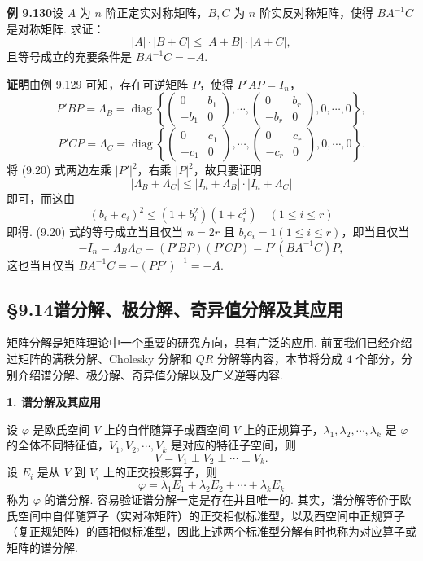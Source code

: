 \documentclass[UTF8, 12pt, fontset=fandol, oneside]{ctexart}
\begin{document}
\noindent\textbf{例 9.130}\quad 设 $A$ 为 $n$ 阶正定实对称矩阵，$B,C$ 为 $n$ 阶实反对称矩阵，使得 $BA^{-1}C$ 是对称矩阵. 求证：
\begin{equation}
|A|\cdot|B+C|\le |A+B|\cdot|A+C|,
\tag{9.20}
\end{equation}
且等号成立的充要条件是 $BA^{-1}C=-A$.

\noindent\textbf{证明}\quad 由例 9.129 可知，存在可逆矩阵 $P$，使得 $P'AP=I_n$，
\[
P'BP=\Lambda_B=\operatorname{diag}\left\{
\begin{pmatrix}
0&b_1\\
-b_1&0
\end{pmatrix},\cdots,
\begin{pmatrix}
0&b_r\\
-b_r&0
\end{pmatrix},
0,\cdots,0
\right\},
\]
\[
P'CP=\Lambda_C=\operatorname{diag}\left\{
\begin{pmatrix}
0&c_1\\
-c_1&0
\end{pmatrix},\cdots,
\begin{pmatrix}
0&c_r\\
-c_r&0
\end{pmatrix},
0,\cdots,0
\right\}.
\]
将 (9.20) 式两边左乘 $|P'|^2$，右乘 $|P|^2$，故只要证明
\[
|\Lambda_B+\Lambda_C|\le |I_n+\Lambda_B|\cdot|I_n+\Lambda_C|
\]
即可，而这由
\[
(b_i+c_i)^2\le(1+b_i^2)(1+c_i^2)\quad (1\le i\le r)
\]
即得. (9.20) 式的等号成立当且仅当 $n=2r$ 且 $b_ic_i=1(1\le i\le r)$，即当且仅当
\[
-I_n=\Lambda_B\Lambda_C=(P'BP)(P'CP)=P'(BA^{-1}C)P,
\]
这也当且仅当 $BA^{-1}C=-(PP')^{-1}=-A$.

\subsection*{§9.14\quad 谱分解、极分解、奇异值分解及其应用}

矩阵分解是矩阵理论中一个重要的研究方向，具有广泛的应用. 前面我们已经介绍过矩阵的满秩分解、Cholesky 分解和 $QR$ 分解等内容，本节将分成 $4$ 个部分，分别介绍谱分解、极分解、奇异值分解以及广义逆等内容.

\noindent\textbf{1. 谱分解及其应用}

设 $\varphi$ 是欧氏空间 $V$ 上的自伴随算子或酉空间 $V$ 上的正规算子，$\lambda_1,\lambda_2,\cdots,\lambda_k$ 是 $\varphi$ 的全体不同特征值，$V_1,V_2,\cdots,V_k$ 是对应的特征子空间，则
\begin{equation}
V=V_1\perp V_2\perp\cdots\perp V_k.
\tag{9.21}
\end{equation}
设 $E_i$ 是从 $V$ 到 $V_i$ 上的正交投影算子，则
\[
\varphi=\lambda_1E_1+\lambda_2E_2+\cdots+\lambda_kE_k
\]
称为 $\varphi$ 的谱分解. 容易验证谱分解一定是存在并且唯一的. 其实，谱分解等价于欧氏空间中自伴随算子（实对称矩阵）的正交相似标准型，以及酉空间中正规算子（复正规矩阵）的酉相似标准型，因此上述两个标准型分解有时也称为对应算子或矩阵的谱分解.
\end{document}
